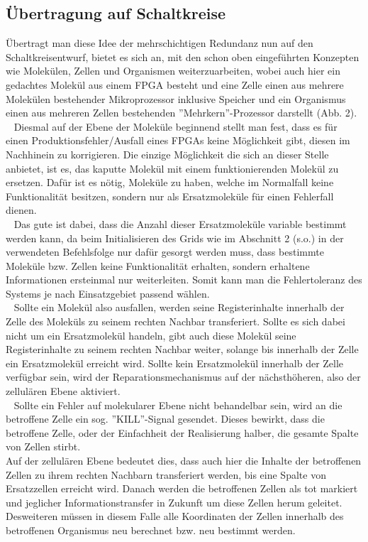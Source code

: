 \documentclass[12p, a4]{article}
\begin{document}
\subsection{Übertragung auf Schaltkreise}
Übertragt man diese Idee der mehrschichtigen Redundanz nun auf den
Schaltkreisentwurf, bietet es sich an, mit den schon oben eingeführten
Konzepten wie Molekülen, Zellen und Organismen weiterzuarbeiten, wobei auch
hier ein gedachtes Molekül aus einem FPGA besteht und eine Zelle einen aus
mehrere Molekülen bestehender Mikroprozessor inklusive Speicher und ein
Organismus einen aus mehreren Zellen bestehenden ''Mehrkern''-Prozessor
darstellt (Abb. 2).\\
\ \newline
Diesmal auf der Ebene der Moleküle beginnend stellt man fest, dass es für
einen Produktionsfehler/Ausfall eines FPGAs keine Möglichkeit gibt, diesen
im Nachhinein zu korrigieren. Die einzige Möglichkeit die sich an dieser
Stelle anbietet, ist es, das kaputte Molekül mit einem funktionierenden
Molekül zu ersetzen. Dafür ist es nötig, Moleküle zu haben, welche im
Normalfall keine Funktionalität besitzen, sondern nur als Ersatzmoleküle
für einen Fehlerfall dienen.\\
\ \newline
Das gute ist dabei, dass die Anzahl dieser Ersatzmoleküle variable
bestimmt werden kann, da beim Initialisieren des Grids wie
im Abschnitt 2 (s.o.) in der verwendeten Befehlsfolge nur dafür gesorgt werden
muss,
dass bestimmte Moleküle bzw. Zellen keine Funktionalität erhalten, sondern
erhaltene Informationen ersteinmal nur weiterleiten. Somit kann man die
Fehlertoleranz des Systems je nach Einsatzgebiet passend wählen.\\
\ \newline
Sollte ein Molekül also ausfallen, werden seine Registerinhalte innerhalb
der Zelle des Moleküls zu seinem
rechten Nachbar transferiert. Sollte es sich dabei nicht um ein
Ersatzmolekül handeln, gibt auch diese Molekül seine Registerinhalte zu seinem
rechten Nachbar weiter, solange bis innerhalb der Zelle ein Ersatzmolekül
erreicht wird. Sollte kein Ersatzmolekül innerhalb der Zelle verfügbar sein,
wird der Reparationsmechanismus auf der nächsthöheren, also der zellulären
Ebene aktiviert.\\
\ \newline
Sollte ein Fehler auf molekularer Ebene nicht behandelbar sein, wird an
die betroffene Zelle ein sog. ''KILL''-Signal gesendet. Dieses bewirkt,
dass die betroffene Zelle, oder der Einfachheit der Realisierung halber,
die gesamte Spalte von Zellen stirbt.\\
Auf der zellulären Ebene bedeutet dies, dass auch hier die Inhalte der
betroffenen Zellen zu ihrem rechten Nachbarn transferiert werden, bis
eine Spalte von Ersatzzellen erreicht wird. Danach werden die betroffenen
Zellen als tot markiert und jeglicher Informationstransfer in Zukunft
um diese Zellen herum geleitet. Desweiteren müssen in diesem Falle alle
Koordinaten der Zellen innerhalb des betroffenen Organismus neu berechnet
bzw. neu bestimmt werden.\\
\end{document}
